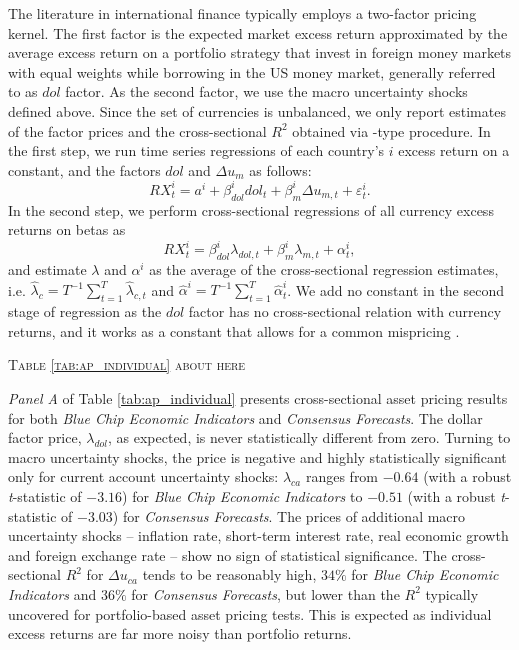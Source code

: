The literature in international finance typically employs a two-factor pricing kernel. The first factor is the expected market excess return approximated by the average excess return on a portfolio strategy that invest in foreign money markets with equal weights while borrowing in the US money market, generally referred to as $dol$ factor.
As the second factor, we use the macro uncertainty shocks defined above. Since the set of currencies is unbalanced, we only report estimates of the factor prices and the cross-sectional $R^2$  obtained via \citet{fama_macbeth1973}-type procedure. In the first step, we run time series regressions of each country's $i$ excess return on a constant, and the factors $dol$ and $\Delta u_{m}$ as follows:
\begin{equation}\label{eq:fmb1_UNC_CAR}
RX_{t}^{i}= a^{i} + \beta_{dol}^{i} dol_{t} + \beta_{m}^{i} \Delta u_{m,t} + \varepsilon_{t}^{i}.
\end{equation}%
In the second step, we perform cross-sectional regressions of all currency excess returns on betas as
\begin{equation}\label{eq:fmb2_UNC_CAR}
RX_{t}^{i}= \beta_{dol}^{i}\lambda_{dol,t}  + \beta_{m}^{i}\lambda_{m,t}  + \alpha^{i}_t,
\end{equation}
and estimate $\lambda$ and $\alpha^{i}$ as the average of the cross-sectional regression estimates, i.e. $\widehat{\lambda}_{c} = T^{-1} \sum_{t=1}^{T} \widehat{\lambda}_{c,t}$ and $\widehat{\alpha}^{i} = T^{-1} \sum_{t=1}^{T} \widehat{\alpha}^{i}_{t}$. We add no constant in the second stage of \citet{fama_macbeth1973} regression as the $dol$ factor has no cross-sectional relation with currency returns, and it works as a constant that allows for a common mispricing \citep[e.g.,][]{lustig_etal2011,burnside2011}.

\begin{center}
	\textsc{Table \ref{tab:ap_individual} about here}
\end{center}

\emph{Panel A} of Table \ref{tab:ap_individual} presents cross-sectional asset pricing results for both \emph{Blue Chip Economic Indicators} and \emph{Consensus Forecasts}. The dollar factor price, $\lambda_{dol}$, as expected, is never statistically different from zero. Turning to macro uncertainty shocks, the price is negative and highly statistically significant only for current account uncertainty shocks: $\lambda _{ca}$ ranges from $-0.64$ (with a robust \emph{t}-statistic of $-3.16$) for \emph{Blue Chip Economic Indicators} to $-0.51$ (with a robust \emph{t}-statistic of $-3.03$) for \emph{Consensus Forecasts}. The prices of additional macro uncertainty shocks -- inflation rate, short-term interest rate, real economic growth and foreign exchange rate -- show no sign of statistical significance. The cross-sectional $R^{2}$ for $\Delta u_{ca}$ tends to be reasonably high, $34\%$ for \emph{Blue Chip Economic Indicators} and  $36\%$ for \emph{Consensus Forecasts}, but lower than the $R^{2}$ typically uncovered for portfolio-based asset pricing tests. This is expected as individual excess returns are far more noisy than portfolio returns.

